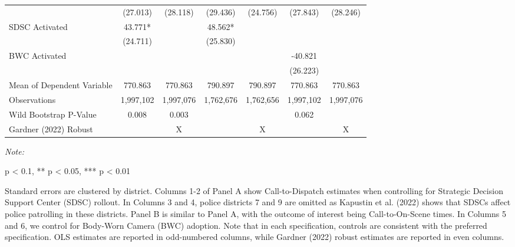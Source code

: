 \begin{table}[H]
\begin{threeparttable}
\begin{tabular}[t]{lcccccc}
\hspace{1em} & (27.013) & (28.118) & (29.436) & (24.756) & (27.843) & (28.246)\\
\hspace{1em}SDSC Activated & 43.771* &  & 48.562* &  &  & \\
\hspace{1em} & (24.711) &  & (25.830) &  &  & \\
\hspace{1em}BWC Activated &  &  &  &  & -40.821 & \\
\hspace{1em} &  &  &  &  & (26.223) & \\
\hspace{1em}Mean of Dependent Variable & 770.863 & 770.863 & 790.897 & 790.897 & 770.863 & 770.863\\
\hspace{1em}Observations & 1,997,102 & 1,997,076 & 1,762,676 & 1,762,656 & 1,997,102 & 1,997,076\\
\hspace{1em}Wild Bootstrap P-Value & 0.008 & 0.003 &  &  & 0.062 & \\
\midrule
Gardner (2022) Robust &  & X &  & X &  & X\\
\bottomrule
\end{tabular}
\begin{tablenotes}
\item \textit{Note: } 
\item * p < 0.1, ** p < 0.05, *** p < 0.01
\item Standard errors are clustered by district. Columns 1-2 of Panel A show                       Call-to-Dispatch estimates when controlling for Strategic                      Decision Support Center (SDSC) rollout. In Columns 3 and 4,                       police districts 7 and 9 are omitted as Kapustin et al. (2022) shows that SDSCs                       affect                      police patrolling in these districts. Panel B is similar to Panel A,                      with the outcome of interest being Call-to-On-Scene times. In Columns 5 and 6,                      we control for Body-Worn Camera (BWC) adoption. Note that in each specification,                      controls are consistent with the preferred specification. OLS estimates are reported                      in odd-numbered columns, while Gardner (2022) robust estimates are reported in even columns.                                     
\end{tablenotes}
\end{threeparttable}
\end{table}

